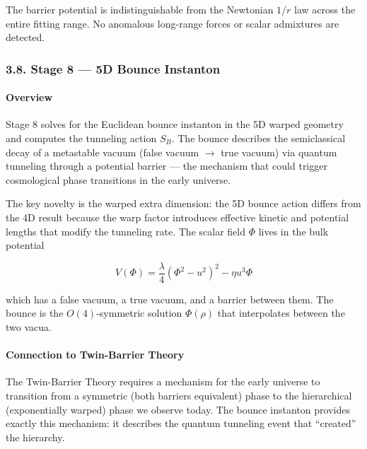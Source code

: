 \documentclass[
  11pt,
]{article}
\begin{document}
The barrier potential is indistinguishable from the Newtonian \(1/r\)
law across the entire fitting range. No anomalous long-range forces or
scalar admixtures are detected.

\bigskip

\hypertarget{stage-8-5d-bounce-instanton}{%
\subsubsection{3.8. Stage 8 --- 5D Bounce
Instanton}\label{stage-8-5d-bounce-instanton}}

\hypertarget{overview-7}{%
\paragraph{Overview}\label{overview-7}}

Stage 8 solves for the Euclidean bounce instanton in the 5D warped
geometry and computes the tunneling action \(S_B\). The bounce describes
the semiclassical decay of a metastable vacuum (false vacuum \(\to\)
true vacuum) via quantum tunneling through a potential barrier --- the
mechanism that could trigger cosmological phase transitions in the early
universe.

The key novelty is the warped extra dimension: the 5D bounce action
differs from the 4D result because the warp factor introduces effective
kinetic and potential lengths that modify the tunneling rate. The scalar
field \(\Phi\) lives in the bulk potential

\[V(\Phi) = \frac{\lambda}{4}(\Phi^2 - u^2)^2 - \eta u^3 \Phi \tag{136}\]

which has a false vacuum, a true vacuum, and a barrier between them. The
bounce is the \(O(4)\)-symmetric solution \(\Phi(\rho)\) that
interpolates between the two vacua.

\bigskip

\hypertarget{connection-to-twin-barrier-theory-7}{%
\paragraph{Connection to Twin-Barrier
Theory}\label{connection-to-twin-barrier-theory-7}}

The Twin-Barrier Theory requires a mechanism for the early universe to
transition from a symmetric (both barriers equivalent) phase to the
hierarchical (exponentially warped) phase we observe today. The bounce
instanton provides exactly this mechanism: it describes the quantum
tunneling event that ``created'' the hierarchy.
\end{document}
